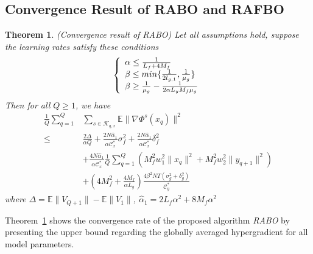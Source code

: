 \documentclass[lettersize,journal]{IEEEtran}
\newtheorem{theorem}{Theorem}
\begin{document}
\subsection{Convergence Result of RABO and RAFBO}
\begin{theorem}\label{convergence1}
(Convergence result of RABO) Let all assumptions hold, suppose the learning rates satisfy these conditions
\begin{equation*}\label{}
   \left\{\begin{array}{l c l}
    \alpha\leq\frac{1}{L_f+4M_f}\\
    \beta\leq min\{\frac{1}{2l_{g,1}}, \frac{1}{\mu_g}\} \nonumber\\
     \beta\geq\frac{1}{\mu_g}-\frac{1}{2\alpha L_yM_f\mu_g}\nonumber
    \end{array}\right.
\end{equation*}
Then for all $Q\geq1$, we have
\begin{align}
     \frac{1}{Q}\sum_{q=1}^Q&\sum_{s\in \mathcal{K}_{q,x}}\mathbb{E}\|\nabla \Phi^s(x_{q})\|^2\\
     \leq &\frac{2\Delta}{\alpha Q}+\frac{2N\hat{\alpha}_1}{\alpha\mathcal{C}_x^*}\sigma_f^2+\frac{2N\hat{\alpha}_1}{\alpha\mathcal{C}_x^*}\delta^2_f\nonumber\\
     &+\frac{4N\hat{\alpha}_1}{\alpha\mathcal{C}_x^*}\frac{1}{Q}\sum_{q=1}^Q(M_f^2 w_1^2 \|x_q\|^2+M_f^2 w_2^2 \|y_{q+1}\|^2)\nonumber\\
     &+(4M_f^2+\frac{4M_f}{\alpha L_y})\frac{4\beta^2NT(\sigma_{g}^2+\delta_{g}^2)}{\mathcal{C}^{*}_{y}}\nonumber
\end{align}
where $\Delta=\mathbb{E}\|V_{Q+1}\|-\mathbb{E}\| V_{1}\|$, $\hat{\alpha}_1=2L_f\alpha^2+8M_f\alpha^2$
\end{theorem}
Theorem~\ref{convergence1} shows the convergence rate of the proposed algorithm \textit{RABO} by presenting the upper bound regarding the globally averaged hypergradient for all model parameters.
\end{document}
